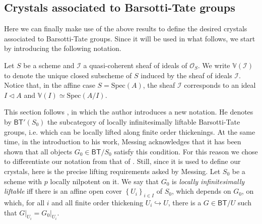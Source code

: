 \subsection{Crystals associated to Barsotti-Tate groups}
Here we can finally make use of the above results to define the desired crystals
associated to Barsotti-Tate groups.
Since it will be used in what follows,
we start by introducing the following notation.


\begin{ntt}
	Let $S$ be a scheme and $\mathcal{I}$ a quasi-coherent sheaf of
	ideals of $\mathcal{O}_{ S }$.
	We write $\mathbb{V}(\mathcal{I})$ to denote the unique
	closed subscheme of $S$ induced by the sheaf of ideals $\mathcal{I}$.
	Notice that, in the affine case $S = \mathrm{Spec}(A)$,
	the sheaf $\mathcal{I}$ corresponds to an ideal $I \triangleleft A$
	and $\mathbb{V}(I) \simeq \mathrm{Spec}(A/I)$.
\end{ntt} 


\begin{rem}[]\label{rem:LocallyLiftableBTG}
	This section follows \cite[Chpater IV, \S2]{Messing},
	in which the author introduces a new notation.
	He denotes by $\mathsf{BT}'(S_0)$ the subcategory of
	locally infinitesimally liftable Barsotti-Tate groups, i.e. 
	which can be locally lifted along finite order thickenings.
	At the same time, in the introduction to his work, Messing acknowledges that
	it has been shown that all objects $G_0 \in \mathsf{BT}/S_0$ satisfy
	this condition.
	For this reason we chose to differentiate our notation from that of \cite{Messing}.
	Still, since it is used to define our crystals, here is the precise lifting
	requirements asked by Messing.
	Let $S_0$ be a scheme with $p$ locally nilpotent on it.
	We say that $G_0$ is {\em locally infinitesimally liftable} iff
	there is an affine open cover $\left\{ U_i \right\}_{i \in I}$ of $S_0$, which depends on $G_0$, 
	on which, for all $i$ and all finite order thickening $U_i \hookrightarrow U$,
	there is a $G \in \mathsf{BT}/U$ such that
	$\left.G\right|_{U_i} = \left.G_0\right|_{U_i}$.
\end{rem}


